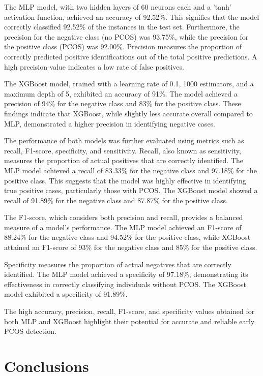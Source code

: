 \documentclass{article}
\begin{document}
The MLP model, with two hidden layers of 60 neurons each and a 'tanh' activation function, achieved an accuracy of 92.52\%. This signifies that the model correctly classified 92.52\% of the instances in the test set. Furthermore, the precision for the negative class (no PCOS) was 93.75\%, while the precision for the positive class (PCOS) was 92.00\%. Precision measures the proportion of correctly predicted positive identifications out of the total positive predictions. A high precision value indicates a low rate of false positives.

The XGBoost model, trained with a learning rate of 0.1, 1000 estimators, and a maximum depth of 5, exhibited an accuracy of 91\%. The model achieved a precision of 94\% for the negative class and 83\% for the positive class. These findings indicate that XGBoost, while slightly less accurate overall compared to MLP, demonstrated a higher precision in identifying negative cases.

The performance of both models was further evaluated using metrics such as recall, F1-score, specificity, and sensitivity. Recall, also known as sensitivity, measures the proportion of actual positives that are correctly identified. The MLP model achieved a recall of 83.33\% for the negative class and 97.18\% for the positive class. This suggests that the model was highly effective in identifying true positive cases, particularly those with PCOS. The XGBoost model showed a recall of 91.89\% for the negative class and 87.87\% for the positive class.

The F1-score, which considers both precision and recall, provides a balanced measure of a model's performance. The MLP model achieved an F1-score of 88.24\% for the negative class and 94.52\% for the positive class, while XGBoost attained an F1-score of 93\% for the negative class and 85\% for the positive class.

Specificity measures the proportion of actual negatives that are correctly identified. The MLP model achieved a specificity of 97.18\%, demonstrating its effectiveness in correctly classifying individuals without PCOS. The XGBoost model exhibited a specificity of 91.89\%.

The high accuracy, precision, recall, F1-score, and specificity values obtained for both MLP and XGBoost highlight their potential for accurate and reliable early PCOS detection.

\section*{Conclusions}
\end{document}
